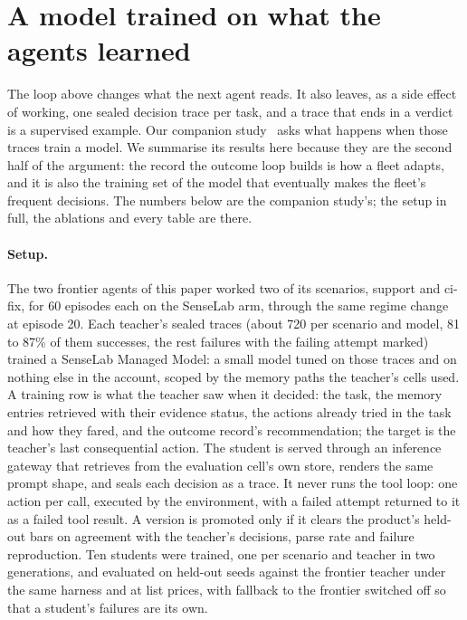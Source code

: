\documentclass[11pt]{article}
\begin{document}
\section{A model trained on what the agents learned}
\label{sec:managed}

The loop above changes what the next agent reads. It also leaves, as a side effect of working,
one sealed decision trace per task, and a trace that ends in a verdict is a supervised example.
Our companion study~\cite{distill} asks what happens when those traces train a model. We
summarise its results here because they are the second half of the argument: the record the
outcome loop builds is how a fleet adapts, and it is also the training set of the model that
eventually makes the fleet's frequent decisions. The numbers below are the companion study's;
the setup in full, the ablations and every table are there.

\paragraph{Setup.} The two frontier agents of this paper worked two of its scenarios, support
and ci-fix, for 60 episodes each on the SenseLab arm, through the same regime change at
episode 20. Each teacher's sealed traces (about 720 per scenario and model, 81 to 87\% of them
successes, the rest failures with the failing attempt marked) trained a SenseLab Managed
Model: a small model tuned on those traces and on nothing else in the account, scoped by the
memory paths the teacher's cells used. A training row is what the teacher saw when it decided:
the task, the memory entries retrieved with their evidence status, the actions already tried in
the task and how they fared, and the outcome record's recommendation; the target is the
teacher's last consequential action. The student is served through an inference gateway that
retrieves from the evaluation cell's own store, renders the same prompt shape, and seals each
decision as a trace. It never runs the tool loop: one action per call, executed by the
environment, with a failed attempt returned to it as a failed tool result. A version is
promoted only if it clears the product's held-out bars on agreement with the teacher's
decisions, parse rate and failure reproduction. Ten students were trained, one per scenario
and teacher in two generations, and evaluated on held-out seeds against the frontier teacher
under the same harness and at list prices, with fallback to the frontier switched off so that
a student's failures are its own.
\end{document}
